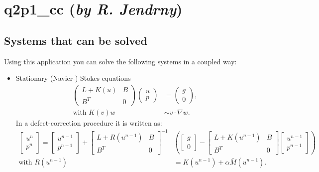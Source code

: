\section{q2p1\_cc ({\it by R. Jendrny})}

\subsection{Systems that can be solved}
Using this application you can solve the following systems in a coupled way:
\begin{itemize}
\item Stationary (Navier-) Stokes equations
\begin{align*}
\begin{pmatrix} L+K(u) & B \\ B^T & 0 \end{pmatrix} \begin{pmatrix} u \\ p \end{pmatrix} &= \begin{pmatrix} g \\ 0 \end{pmatrix},\\
\text{with } K(v) w &\sim v \cdot \nabla w.
\end{align*}
In a defect-correction procedure it is written as:
\begin{align*}
\begin{bmatrix} u^n \\ p^n \end{bmatrix} = \begin{bmatrix} u^{n-1} \\ p^{n-1} \end{bmatrix} +  \begin{bmatrix} L+R(u^{n-1}) & B \\ B^T & 0 \end{bmatrix}^{-1} &\left( \begin{bmatrix} g \\ 0 \end{bmatrix} - \begin{bmatrix} L+K(u^{n-1}) & B \\ B^T & 0 \end{bmatrix} \begin{bmatrix} u^{n-1} \\ p^{n-1} \end{bmatrix}\right) \\
\text{with } R(u^{n-1}) &= K(u^{n-1}) + \alpha \bar{M}(u^{n-1}).
\end{align*}

\end{itemize}
